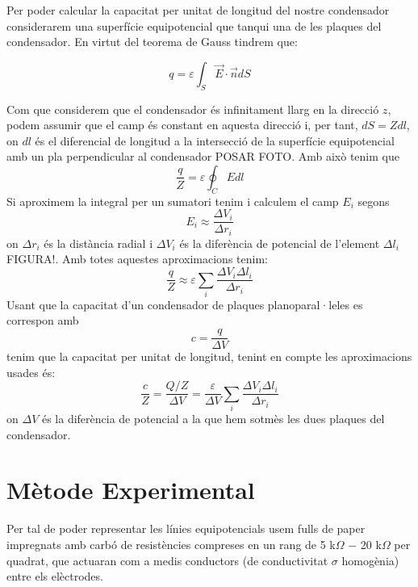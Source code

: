 \documentclass[a4paper,11pt]{report}
\begin{document}
	Per poder calcular la capacitat per unitat de longitud del nostre condensador considerarem una superfície equipotencial que tanqui una de les plaques del condensador. En virtut del teorema de Gauss tindrem que:
	
	\begin{equation}
		q = \varepsilon \int_S \vec{E}\cdot \vec{n}dS
	\end{equation}
	
	Com que considerem que el condensador és infinitament llarg en la direcció $z$, podem assumir que el camp és constant en aquesta direcció i, per tant, $dS = Zdl$, on $dl$ és el diferencial de longitud a la intersecció de la superfície equipotencial amb un pla perpendicular al condensador POSAR FOTO. Amb això tenim que
	\begin{equation}
		\frac{q}{Z} = \varepsilon \oint_C E dl
	\end{equation}
	Si aproximem la integral per un sumatori tenim i calculem el camp $E_i$ segons
	\begin{equation}
		E_i \approx \frac{\Delta V_i}{\Delta r_i}
	\end{equation}
	on $\Delta r_i$ és la distància radial i $\Delta V_i$ és la diferència de potencial de l'element $\Delta l_i$ FIGURA!. Amb totes aquestes aproximacions tenim:
	\begin{equation}
		\frac{q}{Z} \approx \varepsilon \sum_i \frac{\Delta V_i \Delta l_i}{\Delta r_i}
	\end{equation}
	Usant que la capacitat d'un condensador de plaques planoparal·leles es correspon amb 
	\begin{equation}
		c = \frac{q}{\Delta V}
	\end{equation}
	tenim que la capacitat per unitat de longitud, tenint en compte les aproximacions usades és:
	\begin{equation}
		\frac{c}{Z} = \frac{Q/Z}{\Delta V} = \frac{\varepsilon}{\Delta V} \sum_i \frac{\Delta V_i \Delta l_i}{\Delta r_i}  
	\end{equation}
	on $\Delta V$ és la diferència de potencial a la que hem sotmès les dues plaques del condensador.
	
	\section{Mètode Experimental}
	Per tal de poder representar les línies equipotencials usem fulls de paper impregnats amb carbó de resistències compreses en un rang de 5 k$\Omega$ $-$ 20 k$\Omega$ per quadrat, que actuaran com a medis conductors (de conductivitat $\sigma$ homogènia) entre els elèctrodes. 
	
\end{document}
